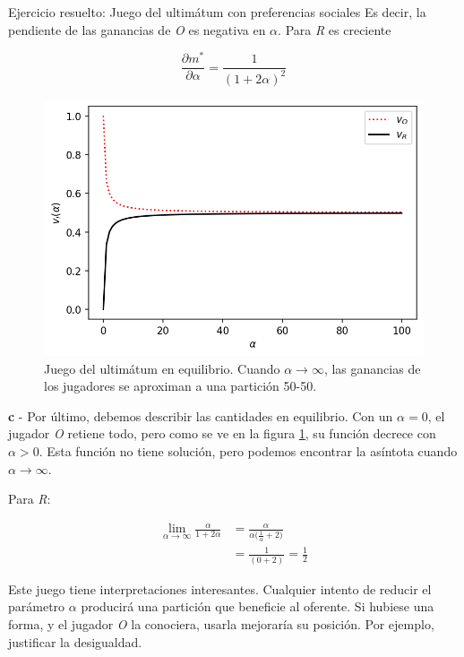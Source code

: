 \documentclass[12pt]{scrartcl}
\begin{document}
\begin{exbox}{Ejercicio resuelto: Juego del ultimátum con preferencias sociales}
	Es decir, la pendiente de las ganancias de \textit{O} es negativa en $\alpha$. Para \textit{R} es creciente
	
	\[ \frac{\partial m^*}{\partial \alpha} = \frac{1}{(1 + 2\alpha)^2}\]
	
	\begin{figure}[H]
		\centering
		\includegraphics[scale=0.56]{figs/bergaining_game.png}
		\caption{Juego del ultimátum en equilibrio. Cuando $\alpha \rightarrow \infty$, las ganancias de los jugadores se aproximan a una partición 50-50.}
		\label{fig:fig9}
	\end{figure}
	
	\textbf{c} - Por último, debemos describir las cantidades en equilibrio. Con un $\alpha = 0$, el jugador \textit{O} retiene todo, pero como se ve en la figura \ref{fig:fig9}, su función decrece con $\alpha > 0$. Esta función no tiene solución, pero podemos encontrar la asíntota cuando $\alpha \rightarrow \infty$. 
	
	Para \textit{R}: \vspace{-1cm}
	
	\begin{align*}
		\lim_{\alpha \rightarrow \infty} \frac{\alpha}{1 + 2 \alpha} & = \frac{\alpha}{\alpha \Big( \frac{1}{\alpha} + 2 \Big)} \\
		                                                             & = \frac{1}{( 0 + 2)} = \frac{1}{2}                       
	\end{align*}
	
	Este juego tiene interpretaciones interesantes. Cualquier intento de reducir el parámetro $\alpha$ producirá una partición que beneficie al oferente. Si hubiese una forma, y el jugador \textit{O} la conociera, usarla mejoraría su posición. Por ejemplo, justificar la desigualdad.
	
\end{exbox}
\end{document}
